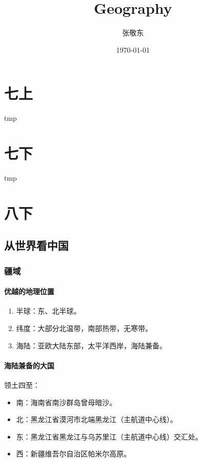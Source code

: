 \documentclass[b5paper,10pt]{book}
\title{Geography}
\author{张敬东}
\date{\today}
\begin{document}
\maketitle
\newpage\newpage

\tableofcontents
\newpage 
{}
\setcounter{page}{1}

\part{七上}
\newpage
tmp
\part{七下}
\newpage
tmp
\part{八下}
\newpage

\chapter{从世界看中国}
\section{疆域}
\subsection{优越的地理位置}

\begin{enumerate}
	\item 半球：东、北半球。
	\item 纬度：大部分北温带，南部热带，无寒带。
	\item 海陆：亚欧大陆东部，太平洋西岸，海陆兼备。
\end{enumerate}

\subsection{海陆兼备的大国}

领土四至：
\begin{itemize}
	\item 南：海南省南沙群岛曾母暗沙。
	\item 北：黑龙江省漠河市北端黑龙江（主航道中心线）。
	\item 东：黑龙江省黑龙江与乌苏里江（主航道中心线）交汇处。
	\item 西：新疆维吾尔自治区帕米尔高原。
\end{itemize}
\end{document}
